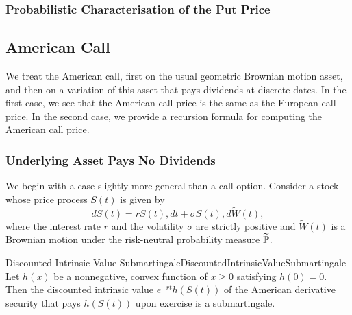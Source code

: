 \subsubsection{Probabilistic Characterisation of the Put Price}

\subsection{American Call}

We treat the American call, first on the usual geometric Brownian motion asset,  and then on a variation of this asset that pays dividends at discrete dates. In the first case, we see that the American call price is the same as the European call price. In the second case, we provide a recursion formula for computing the American call price.

\subsubsection{Underlying Asset Pays No Dividends}

We begin with a case slightly more general than a call option. Consider a stock whose price process $S(t)$ is given by
\begin{equation}
	\label{eq:GeneralGBMRiskNeutral}
	dS(t) = rS(t) , dt + \sigma S(t) , d\widetilde{W}(t),
\end{equation}
where the interest rate $r$ and the volatility $\sigma$ are strictly positive and $\widetilde{W}(t)$ is a Brownian motion under the risk-neutral probability measure $\widetilde{\mathbb{P}}$.

\begin{lem}{Discounted Intrinsic Value Submartingale}{DiscountedIntrinsicValueSubmartingale}
	Let $h(x)$ be a nonnegative, convex function of $x \ge 0$ satisfying $h(0) = 0$. Then the discounted intrinsic value $e^{-rt}h(S(t))$ of the American derivative security that pays $h(S(t))$ upon exercise is a submartingale.
\end{lem}

